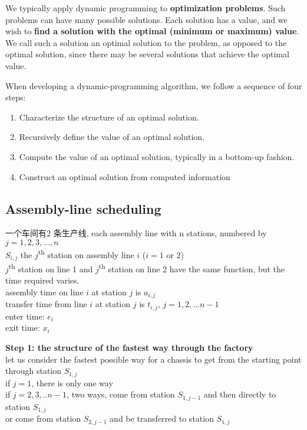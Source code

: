 \documentclass{article}
\begin{document}
We typically apply dynamic programming to \textbf{optimization problems}. Such problems can have many possible solutions. Each solution has a value, and we wish to \textbf{find a solution with the optimal (minimum or maximum) value}. We call such a solution an optimal solution to the problem, as opposed to the optimal solution, since there may be several solutions that achieve the optimal value.

When developing a dynamic-programming algorithm, we follow a sequence of four steps:
\begin{enumerate}
\item Characterize the structure of an optimal solution.
\item Recursively define the value of an optimal solution.
\item Compute the value of an optimal solution, typically in a bottom-up fashion.
\item Construct an optimal solution from computed information
\end{enumerate}

\subsection{Assembly-line scheduling}
 一个车间有2 条生产线, each assembly line with n stations, numbered by $j = 1, 2, 3, …,n$\\
$S_{i,j}$ the $j$\textsuperscript{th} station on assembly line $i$ ($i = 1$ or $2$)\\
$j$\textsuperscript{th} station on line 1 and $j$\textsuperscript{th} station on line 2 have the same function, but the time required varies.\\
assembly time on line $i$ at station $j$ is $a_{i , j}$\\
transfer time from line $i$ at station $j$ is $t_{i,j}$, $j = 1,2, … n-1$\\
enter time: $e_i$\\
exit time: $x_i$

\textbf{Step 1: the structure of the fastest way through the factory}\\
let us consider the fastest possible way for a chassis to get from the starting point through station $S_{1, j}$\\
if $j =1$, there is only one way\\
if $j=2,3,..n-1$, two ways, come from station $S_{1, j-1}$ and then directly to station $S_{1,j}$\\
or come from station $S_{2, j-1}$ and be transferred to station $S_{1, j}$
\end{document}
